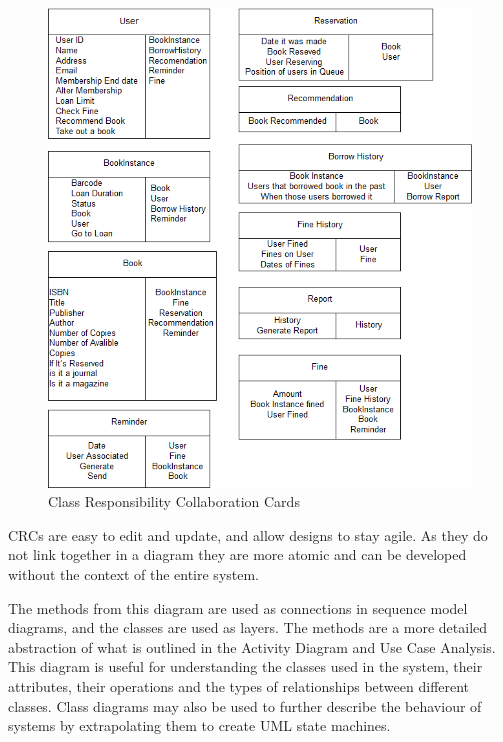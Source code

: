 \begin{figure}[H]
    \centering
    \includegraphics[width=\linewidth]{image/crc.png}
    \caption{Class Responsibility Collaboration Cards}
    \label{fig:crc}
\end{figure}

CRCs are easy to edit and update, and allow designs to stay agile. As they do not link together in a diagram they are more atomic and can be developed without the context of the entire system.

The methods from this diagram are used as connections in sequence model diagrams, and the classes are used as layers. The methods are a more detailed abstraction of what is outlined in the Activity Diagram and Use Case Analysis\cite{ibmclass}. This diagram is useful for understanding the classes used in the system, their attributes, their operations and the types of relationships between different classes. Class diagrams may also be used to further describe the behaviour of systems by extrapolating them to create UML state machines\cite{ambleruml}.